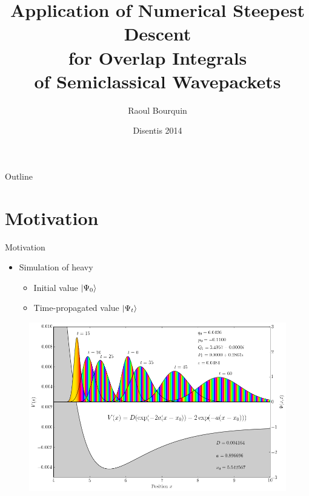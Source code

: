 \documentclass{beamer}
\title[Numerical Steepest Descent for Hagedorn Wavepackets]
      {Application of Numerical Steepest Descent \\
       for Overlap Integrals \\
       of Semiclassical Wavepackets}
\author[]{Raoul Bourquin}
\date{Disentis 2014}
\begin{document}
\begin{frame}
  \titlepage
\end{frame}

\begin{frame}{Outline}
  \tableofcontents
\end{frame}


\section{Motivation}

\begin{frame}{Motivation}
  \begin{itemize}
    \item Simulation of heavy 
    \begin{itemize}
      \item Initial value $\ket{\Psi_0}$
      \item Time-propagated value $\ket{\Psi_t}$
    \end{itemize}
  \end{itemize}
  \begin{figure}
    \centering
    \includegraphics[width=0.7\linewidth]{./fig/hg_morse_wps.png}
  \end{figure}
\end{frame}
\end{document}
